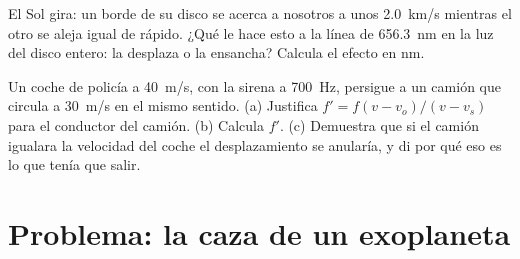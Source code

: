 \begin{exercise}[$\star\star\star$]\label{exo:g12:doppler-effect:14}
El Sol gira: un borde de su disco se acerca a nosotros a unos
\qty{2.0}{km/s} mientras el otro se aleja igual de rápido. ¿Qué le hace
esto a la línea de \qty{656.3}{nm} en la luz del disco entero: la
desplaza o la ensancha? Calcula el efecto en \unit{nm}.
\end{exercise}

\begin{exercise}[$\star\star\star$]\label{exo:g12:doppler-effect:15}
Un coche de policía a \qty{40}{m/s}, con la sirena a \qty{700}{Hz},
persigue a un camión que circula a \qty{30}{m/s} en el mismo sentido.
(a) Justifica $f' = f(v - v_o)/(v - v_s)$ para el conductor del camión.
(b) Calcula $f'$. (c) Demuestra que si el camión igualara la velocidad
del coche el desplazamiento se anularía, y di por qué eso es lo que
tenía que salir.
\end{exercise}

\section{Problema: la caza de un exoplaneta}

